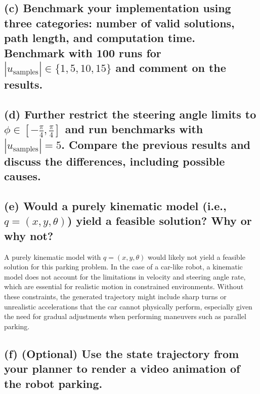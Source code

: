 \documentclass{article}
\begin{document}
\subsection*{(c) Benchmark your implementation using three categories: number of valid solutions, path length, and computation time. Benchmark with 100 runs for \( |u_{\text{samples}}| \in \{1, 5, 10, 15\} \) and comment on the results.}
    
\subsection*{(d) Further restrict the steering angle limits to \( \phi \in \left[-\frac{\pi}{4}, \frac{\pi}{4}\right] \) and run benchmarks with \( |u_{\text{samples}}| = 5 \). Compare the previous results and discuss the differences, including possible causes.}

\subsection*{(e) Would a purely kinematic model (i.e., \( q = (x, y, \theta) \)) yield a feasible solution? Why or why not?}

A purely kinematic model with \( q = (x, y, \theta) \) would likely not yield a feasible solution for this parking problem. In the case of a car-like robot, a kinematic model does not account for the limitations in velocity and steering angle rate, which are essential for realistic motion in constrained environments. Without these constraints, the generated trajectory might include sharp turns or unrealistic accelerations that the car cannot physically perform, especially given the need for gradual adjustments when performing maneuvers such as parallel parking.

\subsection*{(f) (Optional) Use the state trajectory from your planner to render a video animation of the robot parking.}
\end{document}

